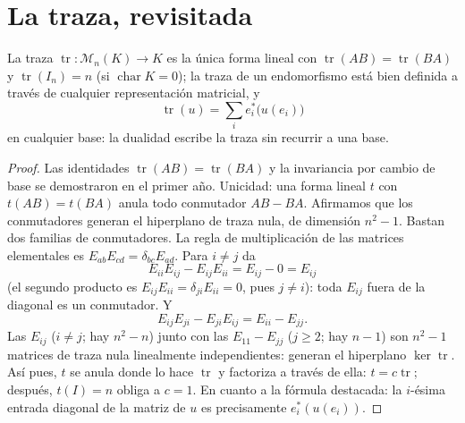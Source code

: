 \section{La traza, revisitada}

\begin{proposition}\label{prop:b2:linalg:trace}
La traza $\operatorname{tr} \colon \mathcal{M}_n(K) \to K$ es la
única forma lineal con $\operatorname{tr}(AB) =
\operatorname{tr}(BA)$ y $\operatorname{tr}(I_n) = n$ (si
$\operatorname{char} K = 0$); la traza de un endomorfismo está bien
definida a través de cualquier representación matricial, y
\[
\operatorname{tr}(u) = \sum_{i} e_i^*\bigl(u(e_i)\bigr)
\]
en cualquier base: la dualidad escribe la traza sin recurrir a una
base.
\end{proposition}

\begin{proof}
Las identidades $\operatorname{tr}(AB) = \operatorname{tr}(BA)$ y la
invariancia por cambio de base se demostraron en el primer año.
Unicidad: una forma lineal $t$ con $t(AB) = t(BA)$ anula todo
conmutador $AB - BA$. Afirmamos que los conmutadores generan el
hiperplano de traza nula, de dimensión $n^2 - 1$. Bastan dos
familias de conmutadores. La regla de multiplicación de las matrices
elementales es $E_{ab}E_{cd} = \delta_{bc}E_{ad}$. Para $i \neq j$ da
\[
E_{ii}E_{ij} - E_{ij}E_{ii} = E_{ij} - 0 = E_{ij}
\]
(el segundo producto es $E_{ij}E_{ii} = \delta_{ji}E_{ii} = 0$,
pues $j \neq i$): toda $E_{ij}$ fuera de la diagonal es un
conmutador. Y
\[
E_{ij}E_{ji} - E_{ji}E_{ij} = E_{ii} - E_{jj} .
\]
Las $E_{ij}$ ($i \neq j$; hay $n^2 - n$) junto con las $E_{11} -
E_{jj}$ ($j \geq 2$; hay $n - 1$) son $n^2 - 1$ matrices de traza
nula linealmente independientes: generan el hiperplano
$\ker\operatorname{tr}$. Así pues, $t$ se anula donde lo hace
$\operatorname{tr}$ y factoriza a través de ella: $t =
c\operatorname{tr}$; después, $t(I) = n$ obliga a $c = 1$. En cuanto
a la fórmula destacada: la $i$-ésima entrada diagonal de la matriz
de $u$ es precisamente $e_i^*(u(e_i))$.
\end{proof}


